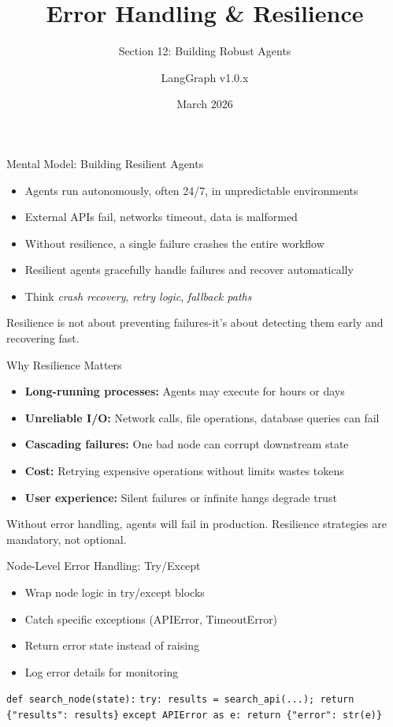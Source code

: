 \documentclass[aspectratio=169,11pt]{beamer}
\title{Error Handling \& Resilience}
\subtitle{Section 12: Building Robust Agents}
\author{LangGraph v1.0.x}
\date{March 2026}
\begin{document}
\frame{\titlepage}

\begin{frame}{Mental Model: Building Resilient Agents}
\setlength{\itemsep}{1pt}
\begin{itemize}
\item Agents run autonomously, often 24/7, in unpredictable environments
\item External APIs fail, networks timeout, data is malformed
\item Without resilience, a single failure crashes the entire workflow
\item Resilient agents gracefully handle failures and recover automatically
\item Think \emph{crash recovery}, \emph{retry logic}, \emph{fallback paths}
\end{itemize}
\vspace{0.15cm}
\begin{conceptbox}
Resilience is not about preventing failures-it's about detecting them early and recovering fast.
\end{conceptbox}
\end{frame}

\begin{frame}{Why Resilience Matters}
\setlength{\itemsep}{1pt}
\begin{itemize}
\item \textbf{Long-running processes:} Agents may execute for hours or days
\item \textbf{Unreliable I/O:} Network calls, file operations, database queries can fail
\item \textbf{Cascading failures:} One bad node can corrupt downstream state
\item \textbf{Cost:} Retrying expensive operations without limits wastes tokens
\item \textbf{User experience:} Silent failures or infinite hangs degrade trust
\end{itemize}
\vspace{0.1cm}
\begin{warningbox}
Without error handling, agents will fail in production. Resilience strategies are mandatory, not optional.
\end{warningbox}
\end{frame}

\begin{frame}{Node-Level Error Handling: Try/Except}
\setlength{\itemsep}{1pt}
\begin{itemize}
\item Wrap node logic in try/except blocks
\item Catch specific exceptions (APIError, TimeoutError)
\item Return error state instead of raising
\item Log error details for monitoring
\end{itemize}
\vspace{0.15cm}
{\small \texttt{def search\_node(state):}}
{\small \texttt{try: results = search\_api(...); return \{"results": results\}}}
{\small \texttt{except APIError as e: return \{"error": str(e)\}}}
\end{frame}
\end{document}
